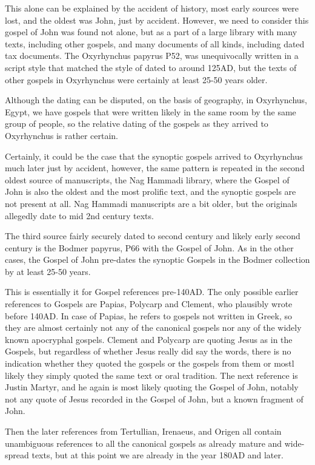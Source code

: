 This alone can be explained by the accident of history, most early sources were lost, and the oldest was John, just by accident.
However, we need to consider this gospel of John was found not alone, but as a part of a large library with many texts, including other gospels, and many documents of all kinds, including dated tax documents.
The Oxyrhynchus papyrus P52, was unequivocally written in a script style that matched the style of dated to around 125AD, but the texts of other gospels in Oxyrhynchus were certainly at least 25-50 years older.

Although the dating can be disputed, on the basis of geography, in Oxyrhynchus, Egypt, we have gospels that were written likely in the same room by the same group of people, so the relative dating of the gospels as they arrived to Oxyrhynchus is rather certain.

Certainly, it could be the case that the synoptic gospels arrived to Oxyrhynchus much later just by accident, however, the same pattern is repeated in the second oldest source of manuscripts, the Nag Hammadi library, where the Gospel of John is also the oldest and the most prolific text, and the synoptic gospels are not present at all.
Nag Hammadi manuscripts are a bit older, but the originals allegedly date to mid 2nd century texts.

The third source fairly securely dated to second century and likely early second century is the Bodmer papyrus, P66 with the Gospel of John.
As in the other cases, the Gospel of John pre-dates the synoptic Gospels in the Bodmer collection by at least 25-50 years.

This is essentially it for Gospel references pre-140AD.
The only possible earlier references to Gospels are Papias, Polycarp and Clement, who plausibly wrote before 140AD.
In case of Papias, he refers to gospels not written in Greek, so they are almost certainly not any of the canonical gospels nor any of the widely known apocryphal gospels.
Clement and Polycarp are quoting Jesus as in the Gospels, but regardless of whether Jesus really did say the words, there is no indication whether they quoted the gospels or the gospels from them or mostl likely they simply quoted the same text or oral tradition.
The next reference is Justin Martyr, and he again is most likely quoting the Gospel of John, notably not any quote of Jesus recorded in the Gospel of John, but a known fragment of John.

Then the later references from Tertullian, Irenaeus, and Origen all contain unambiguous references to all the canonical gospels as already mature and wide-spread texts, but at this point we are already in the year 180AD and later.

